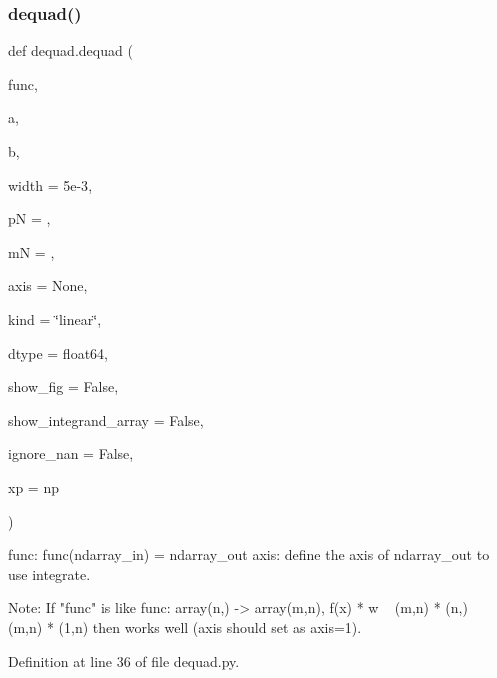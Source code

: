 \subsubsection{\texorpdfstring{dequad()}{dequad()}}
{\footnotesize\ttfamily def dequad.\+dequad (\begin{DoxyParamCaption}\item[{}]{func,  }\item[{}]{a,  }\item[{}]{b,  }\item[{}]{width = {\ttfamily 5e-\/3},  }\item[{}]{pN = {},  }\item[{}]{mN = {},  }\item[{}]{axis = {\ttfamily None},  }\item[{}]{kind = {\ttfamily \char`\"{}linear\char`\"{}},  }\item[{}]{dtype = {\ttfamily float64},  }\item[{}]{show\+\_\+fig = {\ttfamily False},  }\item[{}]{show\+\_\+integrand\+\_\+array = {\ttfamily False},  }\item[{}]{ignore\+\_\+nan = {\ttfamily False},  }\item[{}]{xp = {\ttfamily np} }\end{DoxyParamCaption})}

\begin{DoxyVerb}func: func(ndarray_in) = ndarray_out
axis: define the axis of ndarray_out to use integrate.

Note: If "func" is like func: array(n,) -> array(m,n),
          f(x) * w ~ (m,n) * (n,) ~ (m,n) * (1,n)
      then works well (axis should set as axis=1). 
\end{DoxyVerb}
 

Definition at line 36 of file dequad.\+py.


